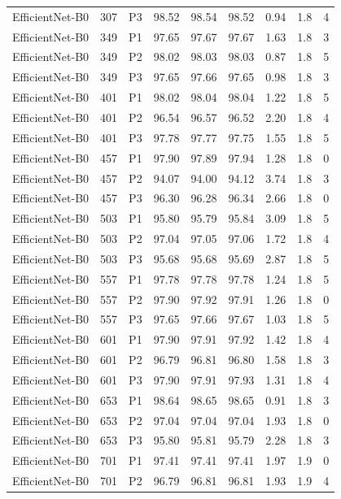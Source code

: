 {\begin{longtable}{lrlrrrrrr}
EfficientNet-B0 & 307 & P3 & 98.52 & 98.54 & 98.52 & 0.94 & 1.8 & 4 \\
EfficientNet-B0 & 349 & P1 & 97.65 & 97.67 & 97.67 & 1.63 & 1.8 & 3 \\
EfficientNet-B0 & 349 & P2 & 98.02 & 98.03 & 98.03 & 0.87 & 1.8 & 5 \\
EfficientNet-B0 & 349 & P3 & 97.65 & 97.66 & 97.65 & 0.98 & 1.8 & 3 \\
EfficientNet-B0 & 401 & P1 & 98.02 & 98.04 & 98.04 & 1.22 & 1.8 & 5 \\
EfficientNet-B0 & 401 & P2 & 96.54 & 96.57 & 96.52 & 2.20 & 1.8 & 4 \\
EfficientNet-B0 & 401 & P3 & 97.78 & 97.77 & 97.75 & 1.55 & 1.8 & 5 \\
EfficientNet-B0 & 457 & P1 & 97.90 & 97.89 & 97.94 & 1.28 & 1.8 & 0 \\
EfficientNet-B0 & 457 & P2 & 94.07 & 94.00 & 94.12 & 3.74 & 1.8 & 3 \\
EfficientNet-B0 & 457 & P3 & 96.30 & 96.28 & 96.34 & 2.66 & 1.8 & 0 \\
EfficientNet-B0 & 503 & P1 & 95.80 & 95.79 & 95.84 & 3.09 & 1.8 & 5 \\
EfficientNet-B0 & 503 & P2 & 97.04 & 97.05 & 97.06 & 1.72 & 1.8 & 4 \\
EfficientNet-B0 & 503 & P3 & 95.68 & 95.68 & 95.69 & 2.87 & 1.8 & 5 \\
EfficientNet-B0 & 557 & P1 & 97.78 & 97.78 & 97.78 & 1.24 & 1.8 & 5 \\
EfficientNet-B0 & 557 & P2 & 97.90 & 97.92 & 97.91 & 1.26 & 1.8 & 0 \\
EfficientNet-B0 & 557 & P3 & 97.65 & 97.66 & 97.67 & 1.03 & 1.8 & 5 \\
EfficientNet-B0 & 601 & P1 & 97.90 & 97.91 & 97.92 & 1.42 & 1.8 & 4 \\
EfficientNet-B0 & 601 & P2 & 96.79 & 96.81 & 96.80 & 1.58 & 1.8 & 3 \\
EfficientNet-B0 & 601 & P3 & 97.90 & 97.91 & 97.93 & 1.31 & 1.8 & 4 \\
EfficientNet-B0 & 653 & P1 & 98.64 & 98.65 & 98.65 & 0.91 & 1.8 & 3 \\
EfficientNet-B0 & 653 & P2 & 97.04 & 97.04 & 97.04 & 1.93 & 1.8 & 0 \\
EfficientNet-B0 & 653 & P3 & 95.80 & 95.81 & 95.79 & 2.28 & 1.8 & 3 \\
EfficientNet-B0 & 701 & P1 & 97.41 & 97.41 & 97.41 & 1.97 & 1.9 & 0 \\
EfficientNet-B0 & 701 & P2 & 96.79 & 96.81 & 96.81 & 1.93 & 1.9 & 4 \\

\end{longtable}}
